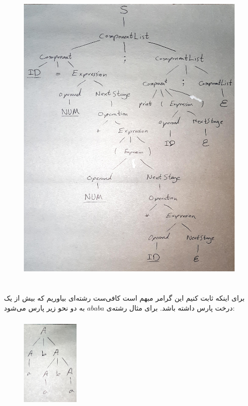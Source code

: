 \documentclass{article}
\begin{document}
\subsection{}
\begin{figure}[H]
    \centering
    \includegraphics[width=1\textwidth]{figures/c7.jpg}
    \caption
	{}
    \label{fig:fig1}
\end{figure}


\section{}%
\subsection{}
برای اینکه ثابت کنیم این گرامر مبهم است کافی‌ست رشته‌ای بیاوریم که بیش از یک درخت پارس داشته باشد. برای مثال رشته‌ی $a b a b a$ به دو نحو زیر پارس می‌شود:
\subsubsection{}
\begin{figure}[H]
    \centering
    \includegraphics[width=0.25\textwidth]{figures/c5.jpg}
    \caption
	{}
    \label{fig:fig1}
\end{figure}
\end{document}
